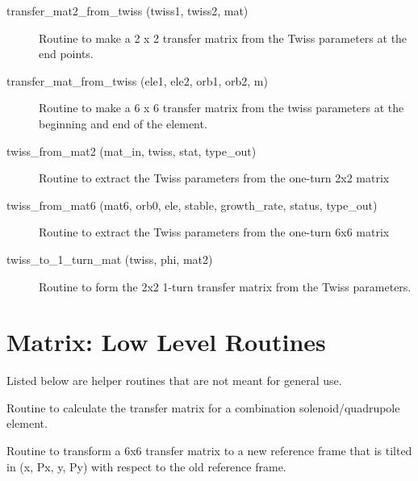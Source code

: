 \begin{description}
\label{r:transfer.mat2.from.twiss}
\item[transfer_mat2_from_twiss (twiss1, twiss2, mat)] \Newline
Routine to make a 2 x 2 transfer matrix from the Twiss parameters at the end points. 

\label{r:transfer.mat.from.twiss}
\item[transfer_mat_from_twiss (ele1, ele2, orb1, orb2, m)] \Newline 
Routine to make a 6 x 6 transfer matrix from the twiss parameters
at the beginning and end of the element.

\label{r:twiss.from.mat2}
\item[twiss_from_mat2 (mat_in, twiss, stat, type_out)] \Newline
Routine to extract the Twiss parameters from the one-turn 2x2 matrix 

\label{r:twiss.from.mat6}
\item[twiss_from_mat6 (mat6, orb0, ele, stable, growth_rate, status, type_out)] \Newline
Routine to extract the Twiss parameters from the one-turn 6x6 matrix 

\item[twiss_to_1_turn_mat (twiss, phi, mat2)] \Newline
Routine to form the 2x2 1-turn transfer matrix from the Twiss parameters. 

\end{description}

\section{Matrix: Low Level Routines}
\label{r:low.mat}  

Listed below are helper routines that are not meant for general use.

\begin{description}

\label{r:sol.quad.mat6.calc}
\item[sol_quad_mat6_calc (ks_in, k1_in, length, ele, orbit, mat6, make_matrix)] \Newline
Routine to calculate the transfer matrix for a combination solenoid/quadrupole element. 

\label{r:tilt.mat6}
\item[tilt_mat6 (mat6, tilt)] \Newline
Routine to transform a 6x6 transfer matrix to a new reference frame that is 
tilted in (x, Px, y, Py) with respect to the old reference frame. 

\end{description}

